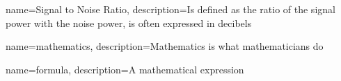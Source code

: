 
{
        name=Signal to Noise Ratio,
        description={Is defined as the ratio of the signal power with the noise power, is often expressed in decibels}
}

{
        name=mathematics,
        description={Mathematics is what mathematicians do}
}

{
        name=formula,
        description={A mathematical expression}
}
